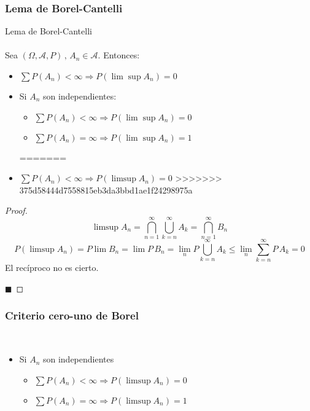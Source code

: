 \documentclass[12pt,a4paper]{book}
\newcommand*{\qed}{\hfill\ensuremath{\blacksquare}}
\begin{document}
\subsubsection{Lema de Borel-Cantelli}
\begin{lemma}
Lema de Borel-Cantelli
\\\\
Sea $(\Omega,\mathcal{A},P) \, , \, A_n \in \mathcal{A}$. Entonces:
\begin{itemize}
<<<<<<< HEAD
\item $\displaystyle\sum P(A_n) < \infty \Longrightarrow P(\displaystyle \lim \sup A_n)=0$
\item Si $ A_n$ son independientes:
\begin{itemize}
\item $\displaystyle\sum P(A_n) < \infty \Longrightarrow P(\displaystyle \lim \sup A_n)=0$
\item $\displaystyle\sum P(A_n) = \infty \Longrightarrow P(\displaystyle \lim \sup A_n)=1$
\end{itemize}
=======
\item $\displaystyle\sum P(A_n) < \infty \Longrightarrow P(\displaystyle \limsup A_n)=0$
>>>>>>> 375d58444d7558815eb3da3bbd1ae1f24298975a
\end{itemize}
\end{lemma}

\begin{proof}
	$$\limsup A_n=\bigcap_{n=1}^\infty \bigcup_{k=n}^{\infty}A_k=\bigcap_{n=1}^\infty B_n$$
	$$P(\limsup A_n)=P\lim B_n=\lim P\, B_n = \lim_n P\bigcup_{k=n}^\infty A_k \leq \lim_n \sum_{k=n}^\infty P\, A_k=0$$
	El recíproco no es cierto.
	
\qed
\end{proof}

\subsubsection{Criterio cero-uno de Borel}
\begin{criterion} 
	\ 
\begin{itemize}
\item Si $ A_n$ son independientes 
	\begin{itemize}
	\item $\displaystyle\sum P(A_n) < \infty \Longrightarrow P(\displaystyle \limsup A_n)=0$
	\item $\displaystyle\sum P(A_n) = \infty \Longrightarrow P(\displaystyle \limsup A_n)=1$
	\end{itemize}
\end{itemize}
\end{criterion}
\end{document}
